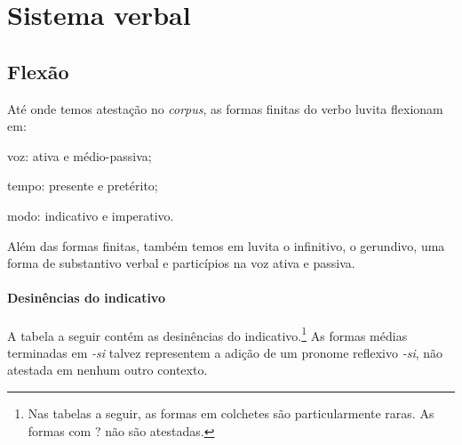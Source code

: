 
\section{Sistema verbal}

\subsection{Flexão}

Até onde temos atestação no \emph{corpus}, as formas finitas do verbo luvita
flexionam em:
\begin{inparaenum}[(a)]
	\item voz: ativa e médio-passiva;
	\item tempo: presente e pretérito;
	\item modo: indicativo e imperativo.
\end{inparaenum}
Além das formas finitas, também temos em luvita o infinitivo, o gerundivo, uma
forma de substantivo verbal e particípios na voz ativa e passiva.

\paragraph{Desinências do indicativo}
A tabela a seguir contém as desinências do indicativo.\footnote{Nas tabelas a
	seguir, as formas em colchetes são particularmente raras. As formas com {?} não
	são atestadas.}
As formas médias terminadas em \emph{-si} talvez representem a adição de um
pronome reflexivo \emph{-si}, não atestada em nenhum outro contexto.

